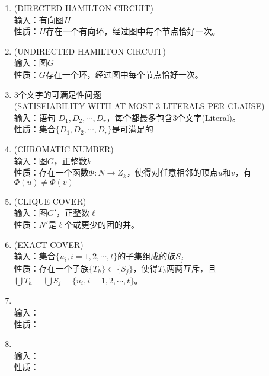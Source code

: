 \documentclass[twocolumn]{article}
\theoremstyle{nonumberplain}%
\begin{document}
\begin{CJK}{UTF8}{gbsn}
\begin{enumerate}
    \item {(DIRECTED HAMILTON CIRCUIT)}\\
    输入：有向图$H$\\
    性质：$H$存在一个有向环，经过图中每个节点恰好一次。

    \item {(UNDIRECTED HAMILTON CIRCUIT)}\\
    输入：图$G$\\
    性质：$G$存在一个环，经过图中每个节点恰好一次。

    \item {3个文字的可满足性问题\\(SATISFIABILITY WITH AT MOST 3 LITERALS PER CLAUSE)}\\
    输入：语句 $D_1,D_2,\cdots,D_r$，每个都最多包含3个文字(Literal)。\\
    性质：集合$\{D_1,D_2,\cdots,D_r\}$是可满足的

    \item {(CHROMATIC NUMBER)}\\
    输入：图$G$，正整数$k$\\
    性质：存在一个函数$\Phi:N\rightarrow Z_k$，使得对任意相邻的顶点$u$和$v$，有$\Phi(u)\neq\Phi(v)$

    \item {(CLIQUE COVER)}\\
    输入：图$G'$，正整数$\ell$\\
    性质：$N'$是$\ell$个或更少的团的并。

    \item {(EXACT COVER)}\\
    输入：集合$\{u_i,i=1,2,\cdots,t\}$的子集组成的族${S_j}$\\
    性质：存在一个子族$\{T_h\}\subset\{S_j\}$，使得$T_h$两两互斥，且$\bigcup T_h=\bigcup S_j=\{u_i,i=1,2,\cdots,t\}$。

    \item {\bf}\\
    输入：\\
    性质：

    \item {\bf}\\
    输入：\\
    性质：


\end{enumerate}
\end{CJK}
\end{document}
